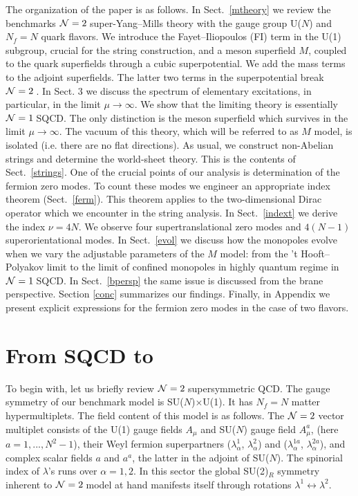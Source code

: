 \documentclass[epsfig,12pt]{article}
\newcommand{\ntwo}{${\cal N}=2\;$}
\newcommand{\none}{${\cal N}=1\;$}
\begin{document}
The organization of the paper is as follows. In Sect.~\ref{mtheory}  we review
the benchmarks \ntwo super-Yang--Mills theory with the gauge group U($N$) 
and $N_f=N$ quark flavors. We introduce the Fayet--Iliopoulos (FI) term
\cite{FI} in the U(1) subgroup, crucial for the string construction,
and a meson superfield $M$, coupled to the quark superfields
through a cubic superpotential. We add the mass terms to the
adjoint superfields. The latter two terms in the superpotential break
\ntwo. In Sect. 3 we discuss the spectrum of elementary excitations,
in particular, in the limit $\mu\to\infty$.
We show that the limiting theory is essentially \none SQCD.
The only distinction is the meson superfield which survives 
in the limit $\mu\to\infty$. The vacuum of this theory, which will be referred to as
$M$ model, is isolated (i.e. there are no flat directions).
As usual, we construct non-Abelian strings and determine the world-sheet
theory. This is the contents of Sect.~\ref{strings}. One of the crucial points of our
analysis is determination of the fermion zero modes.
To count these modes we engineer an appropriate index theorem (Sect.~\ref{ferm}). 
This theorem applies to the two-dimensional Dirac operator
which we encounter in the string analysis. In Sect.~\ref{indext} we derive the index
$\nu = 4N$. We observe four supertranslational zero modes
and $4(N-1)$ superorientational modes. In Sect.~\ref{evol}
we discuss how the monopoles evolve when we vary the adjustable parameters
of the $M$ model: from the 't Hooft--Polyakov limit to the limit
of confined monopoles in highly quantum regime in \none SQCD.
In Sect.~\ref{bpersp} the same issue is discussed from the brane
perspective.
Section \ref{conc} summarizes our findings. Finally, in Appendix
we present explicit expressions 
for the fermion zero modes in the case of two flavors. 

\section{From  \boldmath{\ntwo} SQCD to  \boldmath{\none}}
\label{bulk}
\setcounter{equation}{0}

To begin with, let us  briefly review \ntwo supersymmetric QCD.
The gauge symmetry of our benchmark model   is SU($N$)$\times$U(1).
It has $N_f=N$ matter hypermultiplets.
The field content of this model is
 as follows. The \ntwo vector multiplet
consists of the  U(1)
gauge fields $A_{\mu}$ and SU($N$)  gauge field $A^a_{\mu}$,
(here $a=1,..., N^2-1$), their Weyl fermion superpartners
($\lambda^{1}_{\alpha}$,
 $\lambda^{2}_{\alpha}$) and
($\lambda^{1a}_{\alpha}$, $\lambda^{2a}_{\alpha}$), and
complex  scalar fields $a$ and $a^a$, the latter in the adjoint of
SU($N$). The spinorial index of $\lambda$'s runs over
  $\alpha=1,2$.  In this sector the  global SU(2)$_R$ symmetry inherent to
\ntwo   model at hand manifests itself through rotations
 $\lambda^1 \leftrightarrow \lambda^2$.
 
\end{document}
